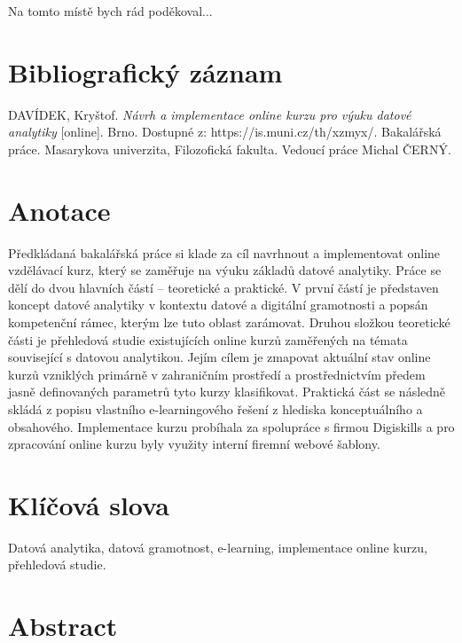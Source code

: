 \documentclass[a4paper,12pt,openany,twoside]{book} %
\begin{document}
\par
\par\vspace*{\fill}

Na tomto místě bych rád poděkoval...

\clearpage

\section*{Bibliografický záznam}

DAVÍDEK, Kryštof. \textit{Návrh a implementace online kurzu pro výuku datové analytiky} [online]. Brno. Dostupné z: https://is.muni.cz/th/xzmyx/. Bakalářská práce. Masarykova univerzita, Filozofická fakulta. Vedoucí práce Michal ČERNÝ.

\section*{Anotace}

Předkládaná bakalářská práce si klade za cíl navrhnout a implementovat online vzdělávací kurz, který se zaměřuje na výuku základů datové analytiky. Práce se dělí do dvou hlavních částí – teoretické a praktické. V první částí je představen koncept datové analytiky v kontextu datové a digitální gramotnosti a popsán kompetenční rámec, kterým lze tuto oblast zarámovat. Druhou složkou teoretické části je přehledová studie existujících online kurzů zaměřených na témata související s datovou analytikou. Jejím cílem je zmapovat aktuální stav online kurzů vzniklých primárně v zahraničním prostředí a prostřednictvím předem jasně definovaných parametrů tyto kurzy klasifikovat. Praktická část se následně skládá z popisu vlastního e-learningového řešení z hlediska konceptuálního a obsahového. Implementace kurzu probíhala za spolupráce s firmou Digiskills a pro zpracování online kurzu byly využity interní firemní webové šablony.

\section*{Klíčová slova}
 
Datová analytika, datová gramotnost, e-learning, implementace online kurzu, přehledová studie.

\clearpage

\section*{Abstract}
\end{document}
